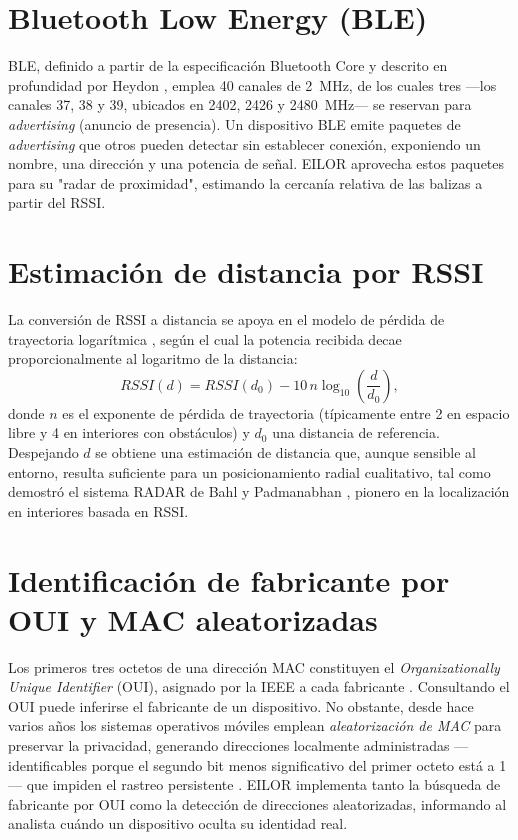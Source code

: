 \section{Bluetooth Low Energy (BLE)}
BLE, definido a partir de la especificación Bluetooth Core \parencite{bluetooth54} y descrito en profundidad por Heydon \parencite{heydon2013}, emplea 40 canales de 2~MHz, de los cuales tres ---los canales 37, 38 y 39, ubicados en 2402, 2426 y 2480~MHz--- se reservan para \emph{advertising} (anuncio de presencia). Un dispositivo BLE emite paquetes de \emph{advertising} que otros pueden detectar sin establecer conexión, exponiendo un nombre, una dirección y una potencia de señal. EILOR aprovecha estos paquetes para su "radar de proximidad", estimando la cercanía relativa de las balizas a partir del RSSI.

\section{Estimación de distancia por RSSI}
La conversión de RSSI a distancia se apoya en el modelo de pérdida de trayectoria logarítmica \parencite{rappaport2002}, según el cual la potencia recibida decae proporcionalmente al logaritmo de la distancia:
\begin{equation}
RSSI(d) = RSSI(d_0) - 10\,n \log_{10}\!\left(\frac{d}{d_0}\right),
\label{eq:pathloss}
\end{equation}
donde $n$ es el exponente de pérdida de trayectoria (típicamente entre 2 en espacio libre y 4 en interiores con obstáculos) y $d_0$ una distancia de referencia. Despejando $d$ se obtiene una estimación de distancia que, aunque sensible al entorno, resulta suficiente para un posicionamiento radial cualitativo, tal como demostró el sistema RADAR de Bahl y Padmanabhan \parencite{bahl2000}, pionero en la localización en interiores basada en RSSI.

\section{Identificación de fabricante por OUI y MAC aleatorizadas}
Los primeros tres octetos de una dirección MAC constituyen el \emph{Organizationally Unique Identifier} (OUI), asignado por la IEEE a cada fabricante \parencite{ieeeoui}. Consultando el OUI puede inferirse el fabricante de un dispositivo. No obstante, desde hace varios años los sistemas operativos móviles emplean \emph{aleatorización de MAC} para preservar la privacidad, generando direcciones localmente administradas ---identificables porque el segundo bit menos significativo del primer octeto está a 1--- que impiden el rastreo persistente \parencite{martin2017}. EILOR implementa tanto la búsqueda de fabricante por OUI como la detección de direcciones aleatorizadas, informando al analista cuándo un dispositivo oculta su identidad real.


